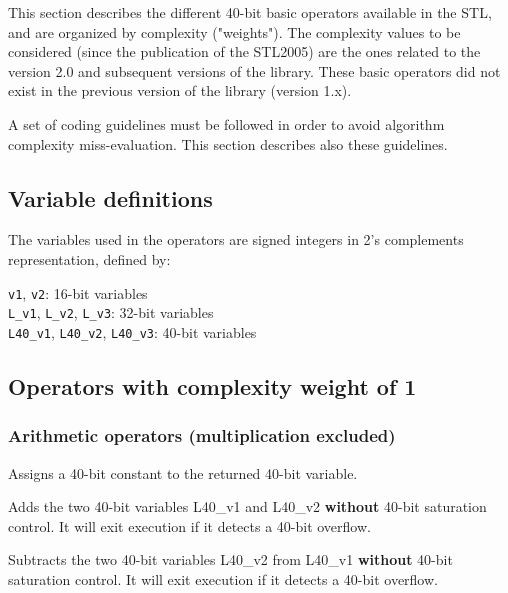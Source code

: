 This section describes the different 40-bit basic operators
available in the STL, and are organized by complexity ("weights").
The complexity values to be considered (since the publication of
the STL2005) are the ones related to the version 2.0 and subsequent versions of the library. These basic operators did not exist in the previous
version of the library (version 1.x).

A set of coding guidelines must be followed in order to avoid
algorithm complexity miss-evaluation. This section describes also
these guidelines.

\subsection{Variable definitions}

The variables used in the operators are signed integers in 2's
complements representation, defined by:

{\tt v1}, {\tt v2}: 16-bit variables\\
{\tt L\_v1}, {\tt L\_v2}, {\tt L\_v3}: 32-bit variables\\
{\tt L40\_v1}, {\tt L40\_v2}, {\tt L40\_v3}: 40-bit variables\\

\subsection{Operators with complexity weight of 1}
\subsubsection{Arithmetic operators (multiplication excluded)}


Assigns a 40-bit constant to the returned 40-bit variable.


Adds the two 40-bit variables L40\_v1 and L40\_v2 \textbf{without}
40-bit saturation control. It will exit execution if it detects a 40-bit overflow.



Subtracts the two 40-bit variables L40\_v2 from L40\_v1
\textbf{without} 40-bit saturation control.
It will exit execution if it detects a 40-bit overflow.

